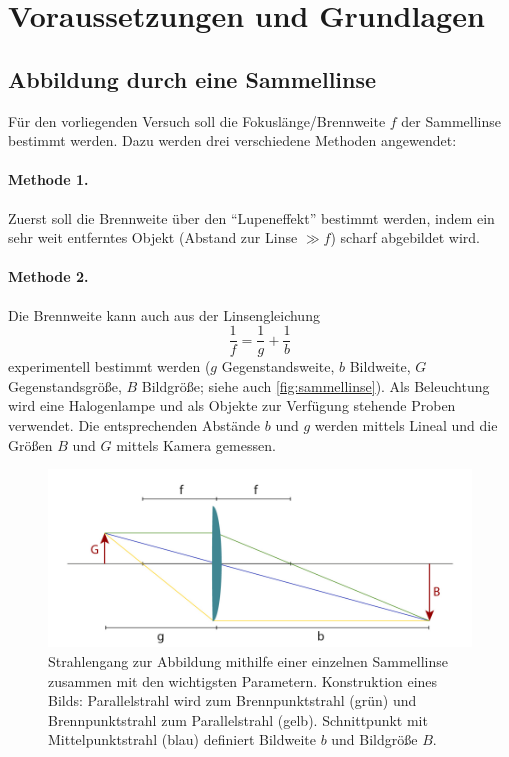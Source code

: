 \documentclass[english, ngerman]{scrartcl}
\begin{document}
\section[Voraussetzungen und Grundlagen]{Voraussetzungen und Grundlagen \cite{ref:angabe}}
\label{sec:voraussetzungen_grundlagen}

\subsection{Abbildung durch eine Sammellinse}
\label{subsec:abbildung_sammellinse_Grundlagen}

Für den vorliegenden Versuch soll die Fokuslänge/Brennweite $f$ der Sammellinse bestimmt werden. Dazu werden drei verschiedene Methoden angewendet:

\paragraph{Methode 1.}
Zuerst soll die Brennweite über den \enquote{Lupeneffekt} bestimmt werden, indem ein sehr weit entferntes Objekt (Abstand zur Linse $\gg f$) scharf abgebildet wird.

\paragraph{Methode 2.}
Die Brennweite kann auch aus der Linsengleichung
%
\begin{equation}
    \label{eq:linsengleichung}
    \frac{1}{f} = \frac{1}{g} + \frac{1}{b}
\end{equation}
%
experimentell bestimmt werden ($g$ Gegenstandsweite, $b$ Bildweite, $G$ Gegenstandsgröße, $B$ Bildgröße; siehe auch \autoref{fig:sammellinse}). Als Beleuchtung wird eine Halogenlampe und als Objekte zur Verfügung stehende Proben verwendet. Die entsprechenden Abstände $b$ und $g$ werden mittels Lineal und die Größen $B$ und $G$ mittels Kamera gemessen.
%
\begin{figure}[H]
    \centering
    \begin{samepage}
        \includegraphics[width=\linewidth]{fig/Sammellinse.png}
        \caption[Strahlengang einer Sammellinse]{Strahlengang zur Abbildung mithilfe einer einzelnen Sammellinse zusammen mit den wichtigsten Parametern. Konstruktion eines Bilds: Parallelstrahl wird zum Brennpunktstrahl (grün) und Brennpunktstrahl zum Parallelstrahl (gelb). Schnittpunkt mit Mittelpunktstrahl (blau) definiert Bildweite $b$ und Bildgröße $B$.}
        \label{fig:sammellinse}
    \end{samepage}
\end{figure}
\end{document}
